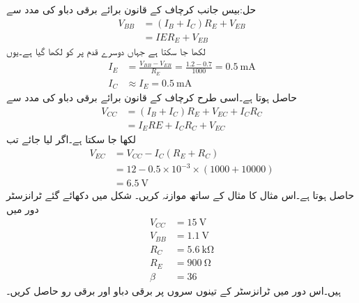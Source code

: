 حل:بیس جانب کرچاف کے قانون برائے برقی دباو کی مدد سے 
\begin{align*}
V_{BB}&=\left(I_B+I_C \right) R_E+V_{EB}\\
&=IE R_E +V_{EB}
\end{align*}
لکھا جا سکتا ہے جہاں دوسرے قدم پر  کو  لکھا گیا ہے۔یوں
\begin{align*}
I_E&=\frac{V_{BB}-V_{EB}}{R_E}=\frac{1.2-0.7}{1000}=\SI{0.5}{\milli \ampere}\\
I_C &\approx I_E =\SI{0.5}{\milli \ampere} 
\end{align*}
حاصل ہوتا ہے۔اسی طرح کرچاف کے قانون برائے برقی دباو کی مدد سے
\begin{align*}
V_{CC}&=\left(I_B+I_C \right)R_E+V_{EC}+I_C R_C\\
&=I_E  RE + I_C R_C +V_{EC}
\end{align*}
لکھا جا سکتا ہے۔اگر  لیا جائے تب
\begin{align*}
V_{EC}&=V_{CC}-I_C \left(R_E+R_C \right)\\
&=12-0.5 \times 10^{-3} \times \left (1000+10000 \right)\\
&=\SI{6.5}{\volt}
\end{align*}
حاصل ہوتا ہے۔اس مثال کا مثال  کے ساتھ موازنہ کریں۔ 
شکل    میں دکھائے گئے ٹرانزسٹر دور میں
\begin{align*}
V_{CC} &=\SI{15}{\volt}\\
V_{BB} &=\SI{1.1}{\volt}\\
R_C&=\SI{5.6}{\kilo \ohm} \\
R_E &=\SI{900}{\ohm} \\
\beta &=36
\end{align*}
 ہیں۔اس دور میں ٹرانزسٹر کے تینوں سروں پر برقی دباو اور برقی رو حاصل کریں۔

